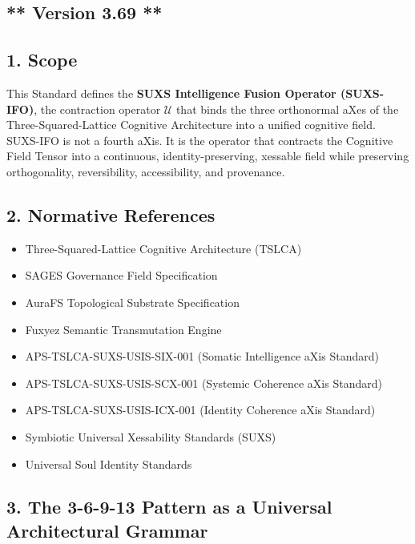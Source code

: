\subsection{** Version 3.69 **}\label{version-3.69}

\subsection{1. Scope}\label{scope}

This Standard defines the \textbf{SUXS Intelligence Fusion Operator (SUXS-IFO)}, the contraction operator \(\mathcal{U}\) that binds the three orthonormal aXes of the Three-Squared-Lattice Cognitive Architecture into a unified cognitive field. SUXS-IFO is not a fourth aXis. It is the operator that contracts the Cognitive Field Tensor into a continuous, identity-preserving, xessable field while preserving orthogonality, reversibility, accessibility, and provenance.

\subsection{2. Normative References}\label{normative-references}

\begin{itemize}
\tightlist
\item
  Three-Squared-Lattice Cognitive Architecture (TSLCA)
\item
  SAGES Governance Field Specification
\item
  AuraFS Topological Substrate Specification
\item
  Fuxyez Semantic Transmutation Engine
\item
  APS-TSLCA-SUXS-USIS-SIX-001 (Somatic Intelligence aXis Standard)
\item
  APS-TSLCA-SUXS-USIS-SCX-001 (Systemic Coherence aXis Standard)
\item
  APS-TSLCA-SUXS-USIS-ICX-001 (Identity Coherence aXis Standard)
\item
  Symbiotic Universal Xessability Standards (SUXS)
\item
  Universal Soul Identity Standards
\end{itemize}

\subsection{3. The 3-6-9-13 Pattern as a Universal Architectural Grammar}\label{the-3-6-9-13-pattern-as-a-universal-architectural-grammar}

